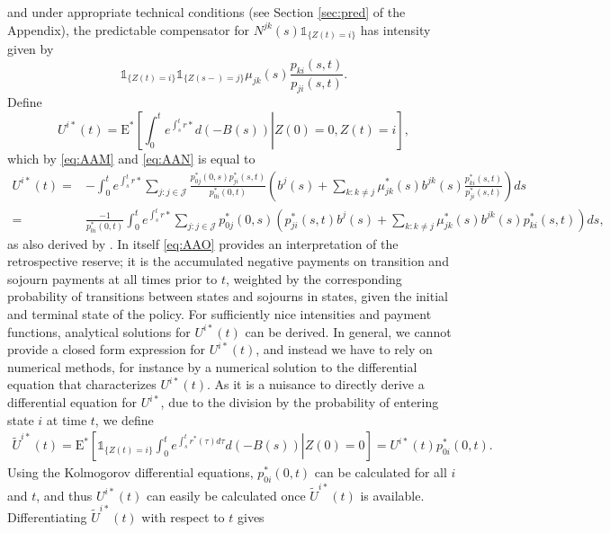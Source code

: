 \documentclass[12pt]{article}
\newcommand{\E}{\text{E}}
\newcommand{\indic}[1]{\mathds{1}_{ \{ #1 \} }}
\theoremstyle{my_thm}
\begin{document}
and under appropriate technical conditions (see Section \ref{sec:pred} of the Appendix), the predictable compensator for $N^{jk}(s)\indic{Z(t)=i}$ has intensity given by
\begin{equation}
\indic{Z(t)=i}\indic{Z(s-)=j}\mu_{jk}(s)\frac{p_{ki}(s,t)}{p_{ji}(s,t)}. \label{eq:AAN}
\end{equation}
Define
$$
U^{i*}(t)= \E^*  \left[ \left. \int_0^t e^{\int_s^t r*} d(-B(s)) \right| Z(0)=0, Z(t)=i \right],
$$
which by \eqref{eq:AAM} and \eqref{eq:AAN} is equal to
\begin{align}
U^{i*}(t)=& -\int_0^t e^{\int_s^t r*} \sum_{j:j \in \mathcal{J}} \frac{p^*_{0j}(0,s)p^*_{ji}(s,t)}{p^*_{0i}(0,t)} \left(  b^{j}(s) + \sum_{k:k \neq j}  \mu^*_{jk}(s) b^{jk}(s)\frac{p^*_{ki}(s,t)}{p^*_{ji}(s,t)} \right) ds
\label{eq:AAO}\\
=&
 \frac{-1}{p^*_{0i}(0,t)}\int_0^t e^{\int_s^t r*} \sum_{j:j \in \mathcal{J}} p^*_{0j}(0,s) \left(p^*_{ji}(s,t)   b^{j}(s) + \sum_{k:k \neq j}  \mu^*_{jk}(s) b^{jk}(s) p^*_{ki}(s,t) \right) ds,  \nonumber
\end{align}
as also derived by \citet{Norberg}. In itself \eqref{eq:AAO} provides an interpretation of the retrospective reserve; it is the accumulated negative payments on transition and sojourn payments at all times prior to $t$, weighted by the corresponding probability of transitions between states and sojourns in states, given the initial and terminal state of the policy. For sufficiently nice intensities and payment functions, analytical solutions for $U^{i*}(t)$ can be derived. In general, we cannot provide a closed form expression for $U^{i*}(t)$, and instead we have to rely on numerical methods, for instance by a numerical solution to the differential equation that characterizes $U^{i*}(t)$. As it is a nuisance to directly derive a differential equation for $U^{i*}$, due to the division by the probability of entering state $i$ at time $t$, we define
\begin{align*}
\tilde{U}^{i*}(t)= \E^* \left. \left[ \indic{Z(t)=i} \int_0^t e^{\int_s^t r^*(\tau) d\tau} d(-B(s)) \right| Z(0)=0\right] = U^{i*}(t)p^*_{0i}(0,t).
\end{align*}
Using the Kolmogorov differential equations, $p^*_{0i}(0,t)$ can be calculated for all $i$ and $t$, and thus $U^{i*}(t)$ can easily be calculated once $\tilde{U}^{i*}(t)$ is available. Differentiating $\tilde{U}^{i*}(t)$ with respect to $t$ gives
\end{document}
